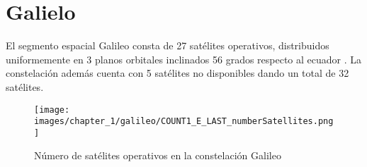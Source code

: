 \section{Galielo}
\label{sec:galileo}

\begin{justify}
    El segmento espacial Galileo consta de 27 satélites operativos, distribuidos uniformemente en 3 planos orbitales
    inclinados 56 grados respecto al ecuador \parencite{gsc_europa}. La constelación además cuenta con 5 satélites no disponibles
    dando un total de 32 satélites.
\end{justify}

\begin{figure}[H]
    \centering
    \texttt{[image: images/chapter\_1/galileo/COUNT1\_E\_LAST\_numberSatellites.png]}
    \caption{Número de satélites operativos en la constelación Galileo}
    \label{fig:galileo_numSatellites}
\end{figure}

